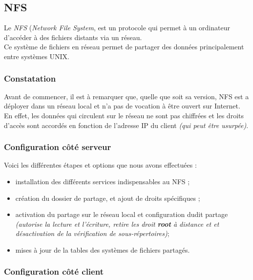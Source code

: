 \subsection{NFS}
\label{subsec:nfs}

Le \emph{NFS} (\textit{Network File System}, est un protocole qui permet à un
ordinateur d'accéder à des fichiers distants via un réseau. \\ Ce système de
fichiers en réseau permet de partager des données principalement entre systèmes
UNIX.

\subsubsection{Constatation}
\label{subsubsec:constatation}

Avant de commencer, il est à remarquer que, quelle que soit sa version, NFS est
a déployer dans un réseau local et n'a pas de vocation à être ouvert sur Internet. \\
En effet, les données qui circulent sur le réseau ne sont pas chiffrées et les
droits d'accès sont accordés en fonction de l'adresse IP du client
\textit{(qui peut être usurpée)}.

\subsubsection{Configuration côté serveur}
\label{subsubsec:config-serveur}

Voici les différentes étapes et options que nous avons effectuées :

\begin{itemize}
    \item installation des différents services indispensables au NFS ;
    \item création du dossier de partage, et ajout de droits
    spécifiques ;
    \item activation du partage sur le réseau local et configuration
    dudit partage \emph{(autorise la lecture et l'écriture, retire les droit
    \textbf{root} à distance et et désactivation de la vérification de sous-répertoires)};
    \item mises à jour de la tables des systèmes de fichiers partagés.
\end{itemize}

\subsubsection{Configuration côté client}
\label{subsubsec:config-client}

